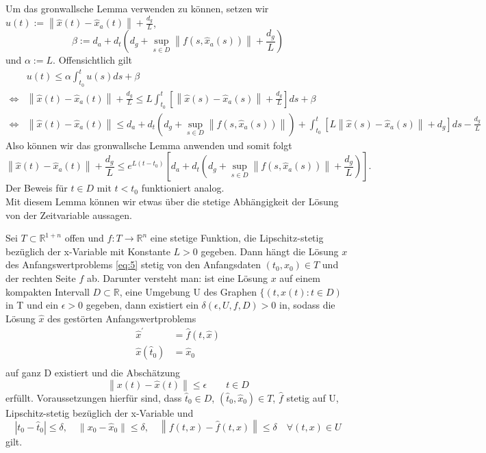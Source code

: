 Um das gronwallsche Lemma verwenden zu können, setzen wir
$u(t):=\left\lVert \hat{x}(t) - \hat{x}_a(t)\right\rVert + \frac{d_g}{L}$,
\[
    \beta:=d_a + d_t(d_g + \sup_{s\in D}\left\lVert f(s,\hat{x}_a(s)) \right\rVert + \frac{d_g}{L})
\] und $\alpha:=L$.
Offensichtlich gilt
\begin{align*}
    &u(t) \leq \alpha \int_{t_0}^{t} u(s) ds + \beta\\
    \Leftrightarrow & \left\lVert \hat{x}(t) - \hat{x}_a(t)\right\rVert + \frac{d_g}{L} \leq
    L \int_{t_0}^{t} \left[\left\lVert \hat{x}(s) - \hat{x}_a(s)\right\rVert + \frac{d_g}{L}\right] ds + \beta \\
    \Leftrightarrow & \left\lVert \hat{x}(t) - \hat{x}_a(t)\right\rVert \leq
    d_a + d_t(d_g + \sup_{s\in D}\left\lVert f(s,\hat{x}_a(s)) \right\rVert) +
    \int_{t_0}^{t} \left[ L \left\lVert \hat{x}(s) - \hat{x}_a(s) \right\rVert + d_g \right] ds - \frac{d_g}{L}
\end{align*}
Also können wir das gronwallsche Lemma anwenden und somit folgt
\[
    \left\lVert \hat{x}(t) - \hat{x}_a(t)\right\rVert + \frac{d_g}{L} \leq
    e^{L(t-t_0)}\left[d_a + d_t(d_g + \sup_{s\in D}\left\lVert f(s,\hat{x}_a(s)) \right\rVert + \frac{d_g}{L})\right].
\]
Der Beweis für $t \in D$ mit $t<t_0$ funktioniert analog. \qedwhite\\
Mit diesem Lemma können wir etwas über die stetige Abhängigkeit der Lösung von der Zeitvariable aussagen.
\begin{satz}
    \label{Satz-stet-abh}
    Sei $T \subset \mathbb{R}^{1+n}$ offen und $f:T \rightarrow \mathbb{R}^{n}$ eine stetige Funktion, die
    Lipschitz-stetig bezüglich der x-Variable mit Konstante $L>0$ gegeben. Dann hängt die Lösung $x$ des
    Anfangswertproblems \eqref{eq:5} stetig von den Anfangsdaten $(t_0, x_0) \in T$ und der rechten Seite $f$ ab.
    Darunter versteht man:
    ist eine Lösung $x$ auf einem kompakten Intervall $D \subset \mathbb{R}$, eine Umgebung U des Graphen
    $\{(t,x(t): t \in D)$ in T und ein $\epsilon>0$ gegeben, dann existiert ein $\delta(\epsilon, U, f, D) >0$ in,
    sodass die Lösung $\hat{x}$ des gestörten Anfangswertproblems
    \begin{align*}
        \hat{x}^{\prime} &= \hat{f}(t,\hat{x})\\
        \hat{x}(\hat{t}_0) &= \hat{x}_0 \\
    \end{align*}
    auf ganz D existiert und die Abschätzung
    \[
        \left\lVert x(t) - \hat{x}(t) \right\rVert \leq \epsilon \qquad t \in D
    \]
    erfüllt. Voraussetzungen hierfür sind, dass $\hat{t}_0 \in D$, $(\hat{t}_0, \hat{x}_0) \in T$, $\hat{f}$ stetig auf
    U, Lipschitz-stetig bezüglich der x-Variable und
    \[
        |t_0 - \hat{t}_0| \leq \delta, \quad \left\lVert x_0 - \hat{x}_0 \right\rVert \leq \delta, \quad
        \left\lVert f(t,x) - \hat{f}(t,x) \right\rVert \leq \delta \quad \forall (t,x) \in U
    \] gilt.
\end{satz}
